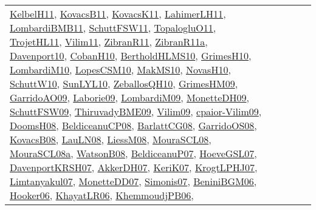 {\begin{longtable}{lp{3cm}>{\raggedright}p{6cm}>{\raggedright}p{6cm}p{8cm}}
\href{articles/KelbelH11.pdf}{KelbelH11}\cite{KelbelH11}, \href{articles/KovacsB11.pdf}{KovacsB11}\cite{KovacsB11}, \href{articles/KovacsK11.pdf}{KovacsK11}\cite{KovacsK11}, \href{papers/LahimerLH11.pdf}{LahimerLH11}\cite{LahimerLH11}, \href{papers/LombardiBMB11.pdf}{LombardiBMB11}\cite{LombardiBMB11}, \href{articles/SchuttFSW11.pdf}{SchuttFSW11}\cite{SchuttFSW11}, \href{articles/TopalogluO11.pdf}{TopalogluO11}\cite{TopalogluO11}, \href{articles/TrojetHL11.pdf}{TrojetHL11}\cite{TrojetHL11}, \href{papers/Vilim11.pdf}{Vilim11}\cite{Vilim11}, \href{papers/ZibranR11.pdf}{ZibranR11}\cite{ZibranR11}, \href{papers/ZibranR11a.pdf}{ZibranR11a}\cite{ZibranR11a}, \href{papers/Davenport10.pdf}{Davenport10}\cite{Davenport10}, \href{papers/CobanH10.pdf}{CobanH10}\cite{CobanH10}, \href{papers/BertholdHLMS10.pdf}{BertholdHLMS10}\cite{BertholdHLMS10}, \href{papers/GrimesH10.pdf}{GrimesH10}\cite{GrimesH10}, \href{papers/LombardiM10.pdf}{LombardiM10}\cite{LombardiM10}, \href{articles/LopesCSM10.pdf}{LopesCSM10}\cite{LopesCSM10}, \href{papers/MakMS10.pdf}{MakMS10}\cite{MakMS10}, \href{articles/NovasH10.pdf}{NovasH10}\cite{NovasH10}, \href{papers/SchuttW10.pdf}{SchuttW10}\cite{SchuttW10}, \href{papers/SunLYL10.pdf}{SunLYL10}\cite{SunLYL10}, \href{articles/ZeballosQH10.pdf}{ZeballosQH10}\cite{ZeballosQH10}, \href{papers/GrimesHM09.pdf}{GrimesHM09}\cite{GrimesHM09}, \href{articles/GarridoAO09.pdf}{GarridoAO09}\cite{GarridoAO09}, \href{papers/Laborie09.pdf}{Laborie09}\cite{Laborie09}, \href{papers/LombardiM09.pdf}{LombardiM09}\cite{LombardiM09}, \href{papers/MonetteDH09.pdf}{MonetteDH09}\cite{MonetteDH09}, \href{papers/SchuttFSW09.pdf}{SchuttFSW09}\cite{SchuttFSW09}, \href{papers/ThiruvadyBME09.pdf}{ThiruvadyBME09}\cite{ThiruvadyBME09}, \href{papers/Vilim09.pdf}{Vilim09}\cite{Vilim09}, \href{papers/cpaior-Vilim09.pdf}{cpaior-Vilim09}\cite{cpaior-Vilim09}, \href{papers/DoomsH08.pdf}{DoomsH08}\cite{DoomsH08}, \href{papers/BeldiceanuCP08.pdf}{BeldiceanuCP08}\cite{BeldiceanuCP08}, \href{papers/BarlattCG08.pdf}{BarlattCG08}\cite{BarlattCG08}, \href{articles/GarridoOS08.pdf}{GarridoOS08}\cite{GarridoOS08}, \href{articles/KovacsB08.pdf}{KovacsB08}\cite{KovacsB08}, \href{papers/LauLN08.pdf}{LauLN08}\cite{LauLN08}, \href{articles/LiessM08.pdf}{LiessM08}\cite{LiessM08}, \href{papers/MouraSCL08.pdf}{MouraSCL08}\cite{MouraSCL08}, \href{papers/MouraSCL08a.pdf}{MouraSCL08a}\cite{MouraSCL08a}, \href{papers/WatsonB08.pdf}{WatsonB08}\cite{WatsonB08}, \href{papers/BeldiceanuP07.pdf}{BeldiceanuP07}\cite{BeldiceanuP07}, \href{papers/HoeveGSL07.pdf}{HoeveGSL07}\cite{HoeveGSL07}, \href{papers/DavenportKRSH07.pdf}{DavenportKRSH07}\cite{DavenportKRSH07}, \href{papers/AkkerDH07.pdf}{AkkerDH07}\cite{AkkerDH07}, \href{papers/KeriK07.pdf}{KeriK07}\cite{KeriK07}, \href{papers/KrogtLPHJ07.pdf}{KrogtLPHJ07}\cite{KrogtLPHJ07}, \href{papers/Limtanyakul07.pdf}{Limtanyakul07}\cite{Limtanyakul07}, \href{papers/MonetteDD07.pdf}{MonetteDD07}\cite{MonetteDD07}, \href{articles/Simonis07.pdf}{Simonis07}\cite{Simonis07}, \href{papers/BeniniBGM06.pdf}{BeniniBGM06}\cite{BeniniBGM06}, \href{articles/Hooker06.pdf}{Hooker06}\cite{Hooker06}, \href{articles/KhayatLR06.pdf}{KhayatLR06}\cite{KhayatLR06}, \href{papers/KhemmoudjPB06.pdf}{KhemmoudjPB06}\cite{KhemmoudjPB06}, 
\end{longtable}}
